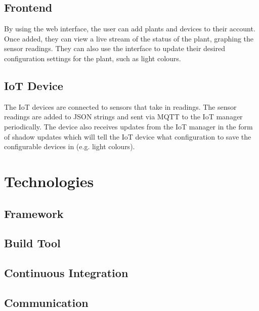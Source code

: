 \documentclass{article}
\begin{document}
	\subsection{Frontend}
	
		By using the web interface, the user can add plants and devices to their account. Once added, they can view a live stream of the status of the plant, graphing the sensor readings. They can also use the interface to update their desired configuration settings for the plant, such as light colours. 
	
	\subsection{IoT Device}
		
		The IoT devices are connected to sensors that take in readings. The sensor readings are added to JSON strings and sent via MQTT to the IoT manager periodically. The device also receives updates from the IoT manager in the form of shadow updates which will tell the IoT device what configuration to save the configurable devices in (e.g. light colours).

	
	
\section{Technologies}

	\subsection{Framework}
	
	\subsection{Build Tool}
	
	\subsection{Continuous Integration}
	
	\subsection{Communication}
\end{document}
